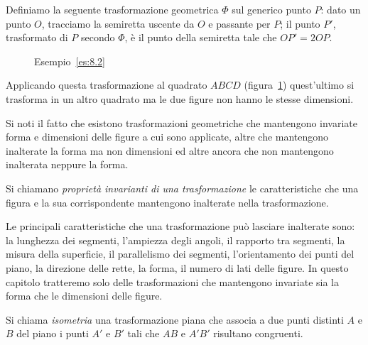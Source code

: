 \begin{esempio}\label{es:8.2}
Definiamo la seguente trasformazione geometrica \(\Phi\) sul generico 
punto \(P\): dato un punto \(O\), tracciamo la semiretta uscente da \(O\) e 
passante per \(P\); il punto \(P'\), trasformato di \(P\) secondo \(\Phi\), è 
il punto della semiretta tale che \(OP'=2OP\).\vspace{7pt}


\begin{inaccessibleblock}
 \begin{figure}[!htb]
    \centering
  \caption{Esempio~\ref{es:8.2}}\label{fig:es8.2}
\end{figure}
\end{inaccessibleblock}

Applicando questa trasformazione al quadrato \(ABCD\) 
(figura~\ref{fig:es8.2}) quest'ultimo si trasforma in un altro 
quadrato ma le due figure non hanno le stesse dimensioni.
\end{esempio}

Si noti il fatto che esistono trasformazioni geometriche che 
mantengono invariate forma e dimensioni delle figure a cui sono 
applicate, altre che mantengono inalterate la forma ma non dimensioni 
ed altre ancora che non mantengono inalterata neppure la forma.

\begin{definizione}
Si chiamano \emph{proprietà invarianti di una trasformazione} le 
caratteristiche che una figura e la sua corrispondente mantengono 
inalterate nella trasformazione.
\end{definizione}

Le principali caratteristiche che una trasformazione può lasciare 
inalterate sono: la lunghezza dei segmenti, l'ampiezza degli angoli, 
il rapporto tra segmenti, la misura della superficie, il parallelismo 
dei segmenti, l'orientamento dei punti del piano, la direzione delle 
rette, la forma, il numero di lati delle figure.
In questo capitolo tratteremo solo delle trasformazioni che 
mantengono invariate sia la forma che le dimensioni delle figure.

\begin{definizione}
Si chiama \emph{isometria} una trasformazione piana che associa a due 
punti distinti \(A\) e \(B\) del piano i punti \(A'\) e \(B'\) tali che \(AB\) 
e \(A'B'\) risultano congruenti.
\end{definizione}

